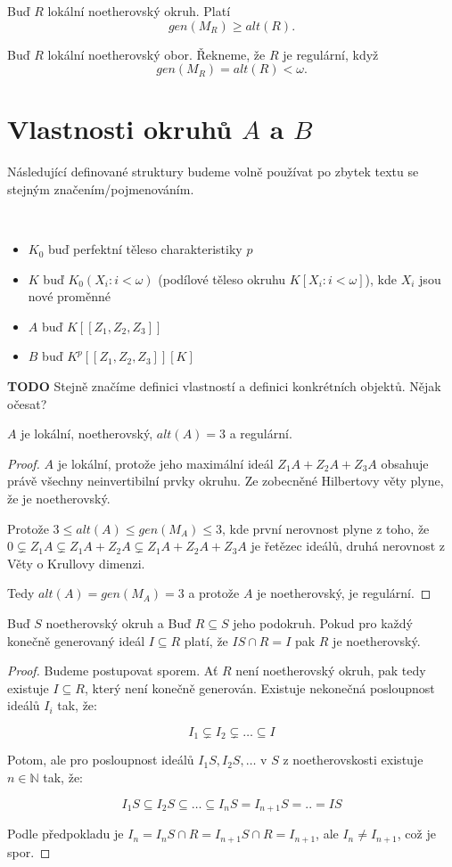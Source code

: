 \documentclass[11pt,a4paper]{article}
\newcommand\m[1]{\mathbb { #1 }} %
\theoremstyle{definition}
\theoremstyle{plain}
\begin{document}
 Buď $R$ lokální noetherovský okruh. Platí
	$$gen(M_R) \geq alt(R).$$

 Buď $R$ lokální noetherovský obor. Řekneme, že $R$ je regulární, když
	$$gen(M_R) = alt(R) < \omega.$$
	
\section{Vlastnosti okruhů $A$ a $B$}
Následující definované struktury budeme volně používat po zbytek textu se
stejným značením/pojmenováním.

 ~\\[-1.5em]
\begin{itemize}
	\item $K_0$ buď perfektní těleso charakteristiky $p$
	\item $K$ buď $K_0(X_i : i < \omega)$ (podílové těleso okruhu $K[X_i : i < \omega]$), kde $X_i$ jsou nové proměnné
	\item $A$ buď $K[[Z_1,Z_2,Z_3]]$
	\item $B$ buď $K^p[[Z_1,Z_2,Z_3]][K]$
\end{itemize}
\textbf{TODO} Stejně značíme definici vlastností a definici konkrétních
objektů. Nějak očesat?


\veta $A$ je lokální, noetherovský, $alt(A) = 3$ a regulární.
\begin{proof}
	$A$ je lokální, protože jeho maximální ideál $Z_1A + Z_2A + Z_3A$ obsahuje
	právě všechny neinvertibilní prvky okruhu. Ze zobecněné Hilbertovy věty
	plyne, že je noetherovský.

	Protože $3 \leq alt(A) \leq gen(M_A) \leq 3$, kde první nerovnost plyne z
	toho, že $0 \subsetneq Z_1A \subsetneq Z_1A + Z_2A \subsetneq Z_1A + Z_2A +
	Z_3A$ je řetězec ideálů, druhá nerovnost z Věty o Krullovy dimenzi.

	Tedy $alt(A) = gen(M_A) = 3$ a protože $A$ je noetherovský, je regulární.
\end{proof}

\lemma Buď $S$ noetherovský okruh a Buď $R \subseteq S$ jeho podokruh. Pokud
pro každý konečně generovaný ideál $I \subseteq R$ platí, že $IS \cap R = I$
pak $R$ je noetherovský.
\begin{proof}
	Budeme postupovat sporem. Ať $R$ není noetherovský okruh, pak tedy existuje
	$I \subseteq R$, který není konečně generován. Existuje nekonečná
	posloupnost ideálů $I_i$ tak, že:

	$$I_1 \subsetneq I_2 \subsetneq \dots \subseteq I$$

	\noindent Potom, ale pro posloupnost ideálů $I_1S, I_2S, \dots$ v $S$ z
	noetherovskosti existuje $n \in \m N$ tak, že:

	$$I_1S \subseteq I_2S \subseteq \dots \subseteq I_nS = I_{n+1}S = .. = IS$$

	\noindent Podle předpokladu je $I_n = I_nS \cap R = I_{n+1}S \cap R =
	I_{n+1}$, ale $I_n \not= I_{n+1}$, což je spor.
\end{proof}
\end{document}
